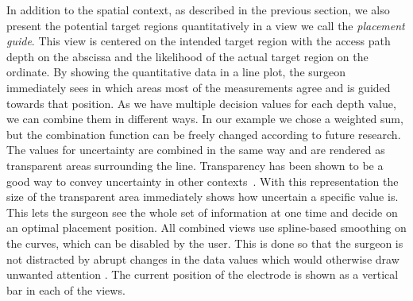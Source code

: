 \documentclass{vgtc}                          %
\begin{document}
In addition to the spatial context, as described in the previous section, we also present the potential target regions quantitatively in a view we call the \emph{placement guide}. This view is centered on the intended target region with the access path depth on the abscissa and the likelihood of the actual target region on the ordinate. By showing the quantitative data in a line plot, the surgeon immediately sees in which areas most of the measurements agree and is guided towards that position. As we have multiple decision values for each depth value, we can combine them in different ways. In our example we chose a weighted sum, but the combination function can be freely changed according to future research. The values for uncertainty are combined in the same way and are rendered as transparent areas surrounding the line. Transparency has been shown to be a good way to convey uncertainty in other contexts~\cite{Djurcilov2002239}. With this representation the size of the transparent area immediately shows how uncertain a specific value is. This lets the surgeon see the whole set of information at one time and decide on an optimal placement position. All combined views use spline-based smoothing on the curves, which can be disabled by the user. This is done so that the surgeon is not distracted by abrupt changes in the data values which would otherwise draw unwanted attention . The current position of the electrode is shown as a vertical bar in each of the views.
\end{document}
